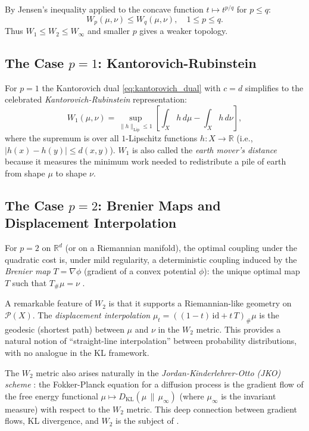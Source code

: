 \documentclass[12pt]{article}
\newcommand{\KL}[2]{D_{\mathrm{KL}}\!\left(#1\,\|\,#2\right)}
\newcommand{\calP}{\mathcal{P}}
\newcommand{\R}{\mathbb{R}}
\begin{document}
By Jensen's inequality applied to the concave function
$t \mapsto t^{p/q}$ for $p \leq q$:
\begin{equation}\label{eq:ordering}
  W_p(\mu,\nu) \leq W_q(\mu,\nu), \quad 1 \leq p \leq q.
\end{equation}
Thus $W_1 \leq W_2 \leq W_\infty$ and smaller $p$ gives a
weaker topology.

\subsection{The Case \texorpdfstring{$p = 1$}{p=1}:
            Kantorovich-Rubinstein}

For $p = 1$ the Kantorovich dual \eqref{eq:kantorovich_dual}
with $c = d$ simplifies to the celebrated
\emph{Kantorovich-Rubinstein} representation:
\begin{equation}\label{eq:w1_dual}
  \boxed{W_1(\mu,\nu)
  = \sup_{\|h\|_{\mathrm{Lip}} \leq 1}
  \left[\int_X h\,d\mu - \int_X h\,d\nu\right],}
\end{equation}
where the supremum is over all $1$-Lipschitz functions
$h: X \to \R$ (i.e., $|h(x) - h(y)| \leq d(x,y)$).
$W_1$ is also called the \emph{earth mover's distance}
because it measures the minimum work needed to redistribute
a pile of earth from shape $\mu$ to shape $\nu$.

\subsection{The Case \texorpdfstring{$p = 2$}{p=2}:
            Brenier Maps and Displacement Interpolation}

For $p = 2$ on $\R^d$ (or on a Riemannian manifold), the
optimal coupling under the quadratic cost is, under mild
regularity, a deterministic coupling induced by the
\emph{Brenier map} $T = \nabla\phi$ (gradient of a convex
potential $\phi$): the unique optimal map $T$ such that
$T_\#\mu = \nu$ \citep{Brenier1991}.

A remarkable feature of $W_2$ is that it supports a
Riemannian-like geometry on $\calP(X)$.  The
\emph{displacement interpolation} \citep{McCann1997}
$\mu_t = ((1-t)\,\mathrm{id} + t\,T)_\#\mu$ is the geodesic
(shortest path) between $\mu$ and $\nu$ in the $W_2$ metric.
This provides a natural notion of ``straight-line
interpolation'' between probability distributions, with no
analogue in the KL framework.

The $W_2$ metric also arises naturally in the
\emph{Jordan-Kinderlehrer-Otto (JKO) scheme}
\citep{Jordan1998}: the Fokker-Planck equation for a diffusion
process is the gradient flow of the free energy functional
$\mu \mapsto \KL{\mu}{\mu_\infty}$ (where $\mu_\infty$ is the
invariant measure) with respect to the $W_2$ metric.  This
deep connection between gradient flows, KL divergence, and $W_2$
is the subject of \citet{AmbrosioGigliSavare2008}.
\end{document}
